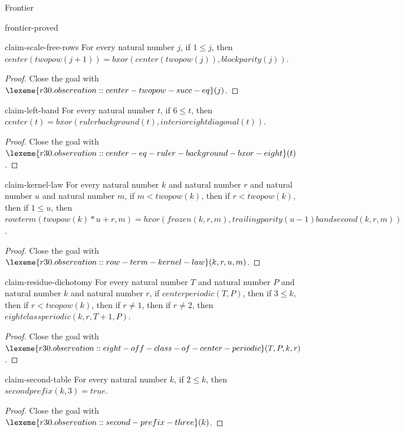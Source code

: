 \begin{lexlean}{Frontier}
\begin{section}{frontier-proved}
\begin{theorem}{claim-scale-free-rows}
For every natural number \(j\), if \(1 ≤ j\), then \(center(twopow(j + 1)) = bxor(center(twopow(j)), blockparity(j))\).
\begin{proof}
Close the goal with \(\lexeme{r30.observation::center-twopow-succ-eq}(j)\).
\end{proof}
\end{theorem}

\begin{theorem}{claim-left-band}
For every natural number \(t\), if \(6 ≤ t\), then \(center(t) = bxor(rulerbackground(t), interioreightdiagonal(t))\).
\begin{proof}
Close the goal with \(\lexeme{r30.observation::center-eq-ruler-background-bxor-eight}(t)\).
\end{proof}
\end{theorem}

\begin{theorem}{claim-kernel-law}
For every natural number \(k\) and natural number \(r\) and natural number \(u\) and natural number \(m\), if \(m < twopow(k)\), then if \(r < twopow(k)\), then if \(1 ≤ u\), then \(rowterm(twopow(k) * u + r, m) = bxor(frozen(k, r, m), trailingparity(u - 1) band second(k, r, m))\).
\begin{proof}
Close the goal with \(\lexeme{r30.observation::row-term-kernel-law}(k, r, u, m)\).
\end{proof}
\end{theorem}

\begin{theorem}{claim-residue-dichotomy}
For every natural number \(T\) and natural number \(P\) and natural number \(k\) and natural number \(r\), if \(centerperiodic(T, P)\), then if \(3 ≤ k\), then if \(r < twopow(k)\), then if \(r ≠ 1\), then if \(r ≠ 2\), then \(eightclassperiodic(k, r, T + 1, P)\).
\begin{proof}
Close the goal with \(\lexeme{r30.observation::eight-off-class-of-center-periodic}(T, P, k, r)\).
\end{proof}
\end{theorem}

\begin{theorem}{claim-second-table}
For every natural number \(k\), if \(2 ≤ k\), then \(secondprefix(k, 3) = true\).
\begin{proof}
Close the goal with \(\lexeme{r30.observation::second-prefix-three}(k)\).
\end{proof}
\end{theorem}


\end{section}
\end{lexlean}
